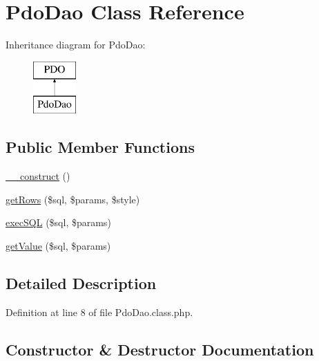 \hypertarget{class_pdo_dao}{}\section{Pdo\+Dao Class Reference}
\label{class_pdo_dao}
Inheritance diagram for Pdo\+Dao\+:\begin{figure}[H]
\begin{center}
\leavevmode
\includegraphics[height=2.000000cm]{class_pdo_dao}
\end{center}
\end{figure}
\subsection*{Public Member Functions}
\begin{DoxyCompactItemize}
\item 
\hyperlink{class_pdo_dao_a095c5d389db211932136b53f25f39685}{\+\_\+\+\_\+construct} ()
\item 
\hyperlink{class_pdo_dao_a12c1ef0decfa06f2f07cb681f3be8c50}{get\+Rows} (\$sql, \$params, \$style)
\item 
\hyperlink{class_pdo_dao_a5ba34a0a513050a7983c8c9f03a30732}{exec\+S\+QL} (\$sql, \$params)
\item 
\hyperlink{class_pdo_dao_a25d71275d800f84b28ec8bd6e055a675}{get\+Value} (\$sql, \$params)
\end{DoxyCompactItemize}


\subsection{Detailed Description}


Definition at line 8 of file Pdo\+Dao.\+class.\+php.



\subsection{Constructor \& Destructor Documentation}
\mbox{\label{class_pdo_dao_a095c5d389db211932136b53f25f39685}} 
